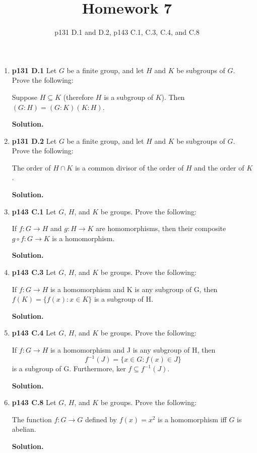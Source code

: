 \documentclass[11pt]{article}
\begin{document}
\title{Homework 7}
\date{p131 D.1 and D.2, p143 C.1, C.3, C.4, and C.8}
\maketitle

\thispagestyle{fancy}  
\pagestyle{fancy}      

\begin{enumerate}

\item {\bfseries p131 D.1} Let $G$ be a finite group, and let $H$ and $K$ be subgroups of $G$. Prove the following:
	
	Suppose $H \subseteq K$ (therefore $H$ is a subgroup of $K$). Then $(G:H)=(G:K)(K:H)$.
  
	{\bfseries Solution.}

\item {\bfseries p131 D.2} Let $G$ be a finite group, and let $H$ and $K$ be subgroups of $G$. Prove the following:
	
	The order of $H \cap K$ is a common divisor of the order of $H$ and the order of $K$.
  
	{\bfseries Solution.}
  
\newpage

\item {\bfseries p143 C.1} Let $G$, $H$, and $K$ be groups. Prove the following:
 
	If $f : G \rightarrow H$ and $g : H \rightarrow K$ are homomorphisms, then their composite $g \circ f : G \rightarrow K$ is a homomorphism.
  
	{\bfseries Solution.}

\item {\bfseries p143 C.3} Let $G$, $H$, and $K$ be groups. Prove the following:
 
	If $f : G \rightarrow H$ is a homomorphism and K is any subgroup of G, then $f(K) = \{f(x) : x \in K\}$ is a subgroup of H.
  
	{\bfseries Solution.}

\item {\bfseries p143 C.4} Let $G$, $H$, and $K$ be groups. Prove the following:
 
	If $f : G \rightarrow H$ is a homomorphism and J is any subgroup of H, then
	$$f^{-1}(J) = \{x \in G : f(x) \in J\}$$
	is a subgroup of G. Furthermore, ker $f \subseteq f^{-1}(J)$.
  
	{\bfseries Solution.}

\item {\bfseries p143 C.8} Let $G$, $H$, and $K$ be groups. Prove the following:
 
	The function $f : G \rightarrow G$ defined by $f(x) = x^2$ is a homomorphism iff $G$ is abelian.
  
	{\bfseries Solution.}

\end{enumerate}
\end{document}
